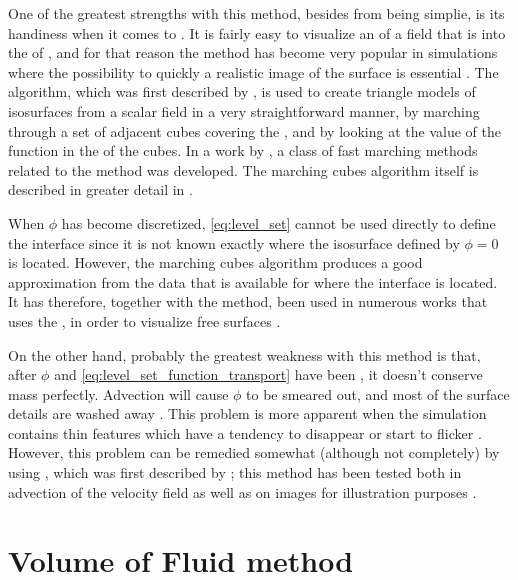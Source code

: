 One of the greatest strengths with this method, besides from being simplie, is its handiness when it comes to . It is fairly easy to visualize an \isosurface of a field that is \discretized into the \nodes of , and for that reason the \LS method has become very popular in \FVM simulations where the possibility to quickly \render a realistic image of the surface is essential \citep{Losasso2004,Chentanez2011}. The  algorithm, which was first described by \citet{Lorensen1987}, is used to create triangle models of isosurfaces from a scalar field in a very straightforward manner, by marching through a set of adjacent cubes covering the , and by looking at the value of the function in the  of the cubes. In a work by \citet{Sethian1995}, a class of fast marching methods related to the \LS method was developed. The marching cubes algorithm itself is described in greater detail in .

When $\phi$ has become discretized, \eqref{eq:level_set} cannot be used directly to define the interface since it is not known exactly where the isosurface defined by $\phi = 0$ is located. However, the marching cubes algorithm produces a good approximation from the data that is available for where the interface is located. It has therefore, together with the \LS method, been used in numerous works that uses the \FVM, in order to visualize free surfaces \citep[e.g.][]{Losasso2004}.

On the other hand, probably the greatest weakness with this method is that, after $\phi$ and \eqref{eq:level_set_function_transport} have been \discretized, it doesn't conserve mass perfectly. Advection will cause $\phi$ to be smeared out, and most of the surface details are washed away \citep{Wojtan2009}. This problem is more apparent when the simulation contains thin features which have a tendency to disappear or start to flicker \citep{nthuerey2009}. However, this problem can be remedied somewhat (although not completely) by using \BFECC, which was first described by \citet{Dupont2003}; this method has been tested both in advection of the velocity field as well as on images for illustration purposes \citep{Kim2005}.

\section{Volume of Fluid method}

